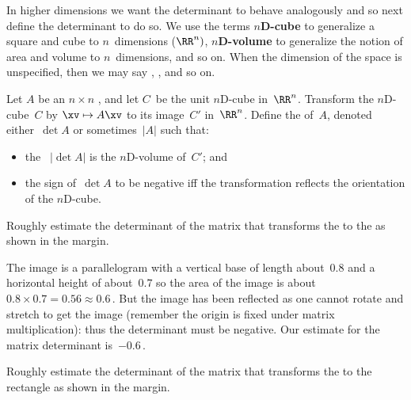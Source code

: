 In higher dimensions we want the determinant to behave analogously and so next define the determinant to do so.
We use the terms \textbf{$n$D-cube} to generalize a square and cube to \(n\)~dimensions (\(\RR^n)\), \textbf{$n$D-volume} to generalize the notion of area and volume to \(n\)~dimensions, and so on.
When the dimension of the space is unspecified, then we may say , , and so on.


\begin{definition} \label{def:detarea} 
Let \(A\) be an \(n\times n\) , and let \(C\)~be the unit $n$D-cube in~\(\RR^n\).
Transform the \(n\)D-cube~\(C\) by \(\xv\mapsto A\xv\)\index{$\mapsto$} to its image~\(C'\) in~\(\RR^n\). 
Define the  of~\(A\), denoted either~\(\det A\) or sometimes~\(|A|\) such that:  \begin{itemize}
\item the ~\(|\det A|\) is the $n$D-volume of~\(C'\); and 
\item the sign of~\(\det A\) to be negative iff the transformation reflects the orientation of the $n$D-cube.
\end{itemize}
\end{definition}




\begin{example} 
Roughly estimate the determinant of the matrix that transforms the  to the  as shown in the margin.
\begin{solution} 
The image is a parallelogram with a vertical base of length about~\(0.8\) and a horizontal height of about~\(0.7\) so the area of the image is about~\(0.8\times0.7=0.56\approx 0.6\)\,.
But the image has been reflected as one cannot rotate and stretch to get the image (remember the origin is fixed under matrix multiplication): thus the determinant must be negative.
Our estimate for the matrix determinant is~\(-0.6\)\,.
\end{solution}
\end{example}



\begin{activity}
Roughly estimate the determinant of the matrix that transforms the  to the rectangle as shown in the margin.
\end{activity}




